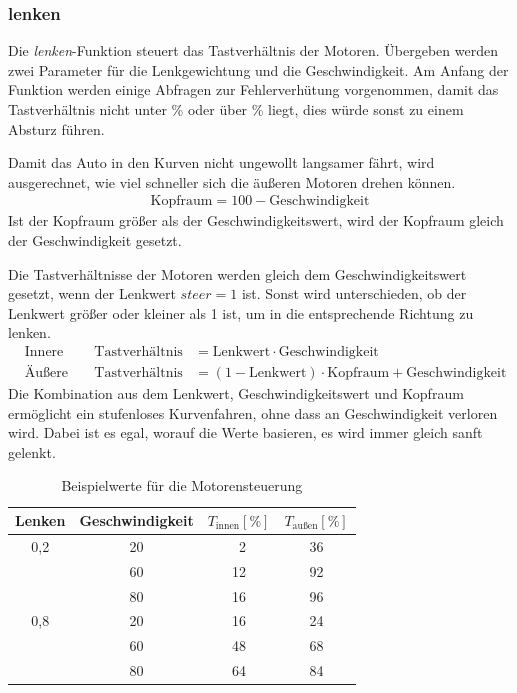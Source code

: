 \documentclass[a4paper, 12pt]{scrartcl}
\begin{document}
\subsubsection{lenken}


Die \textit{lenken}-Funktion steuert das Tastverhältnis der Motoren. Übergeben werden zwei Parameter für die Lenkgewichtung und die Geschwindigkeit. Am Anfang der Funktion werden einige Abfragen zur Fehlerverhütung vorgenommen, damit das Tastverhältnis nicht unter \unit[0]{\%} oder über \unit[100]{\%} liegt, dies würde sonst zu einem Absturz führen.

Damit das Auto in den Kurven nicht ungewollt langsamer fährt, wird ausgerechnet, wie viel schneller sich die äußeren Motoren drehen können.
\begin{align}
\text{Kopfraum} = 100-\text{Geschwindigkeit}
\end{align}
Ist der Kopfraum größer als der Geschwindigkeitswert, wird der Kopfraum gleich der Geschwindigkeit gesetzt.

Die Tastverhältnisse der Motoren werden gleich dem Geschwindigkeitswert gesetzt, wenn der Lenkwert $steer=1$ ist. Sonst wird unterschieden, ob der Lenkwert größer oder kleiner als 1 ist, um in die entsprechende Richtung zu lenken.
\begin{align}
	&\text{Innere Motoren:} &\text{Tastverhältnis} &= \text{Lenkwert}\cdot\text{Geschwindigkeit}\\
	&\text{Äußere Motoren:} &\text{Tastverhältnis} &= (1-\text{Lenkwert})\cdot\text{Kopfraum}+\text{Geschwindigkeit}
\end{align}
Die Kombination aus dem Lenkwert, Geschwindigkeitswert und Kopfraum ermöglicht ein stufenloses Kurvenfahren, ohne dass an Geschwindigkeit verloren wird. Dabei ist es egal, worauf die Werte basieren, es wird immer gleich sanft gelenkt.

\begin{table}[H]
	\centering
	\begin{tabular}{c|c|c|c}
		Lenken & Geschwindigkeit & $T_{\text{innen}} [\%]$ &  $T_{\text{außen}}[\%]$ \\ \hline 
		0,2 & 20 & \ 2 & 36 \\  
		    & 60 & 12  & 92 \\    
		    & 80 & 16  & 96 \\ \hline
		0,8 & 20 & 16  & 24 \\
		    & 60 & 48  & 68 \\
		    & 80 & 64  & 84 \\
	\end{tabular} 
	\caption{Beispielwerte für die Motorensteuerung}
\end{table}
\end{document}
